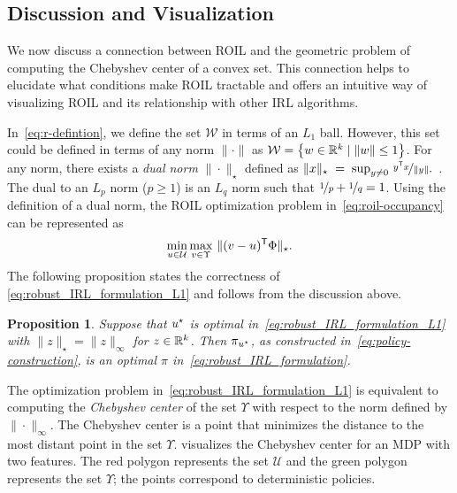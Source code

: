 \documentclass[10pt]{article}
\renewcommand{\cite}{\citep}
\theoremstyle{plain}
\newtheorem{proposition}{Proposition}
\theoremstyle{remark}
\newcommand{\gersi}[1]{\textcolor{red}{[#1]}}
\begin{document}
\subsection{Discussion and Visualization}
\label{sec:geom-intu-reduct}

We now discuss a connection between ROIL and the geometric problem of computing the Chebyshev center of a convex set. This connection helps to elucidate what conditions make ROIL tractable and offers an intuitive way of visualizing ROIL and its relationship with other IRL algorithms. 

In~\eqref{eq:r-defintion}, we define the set $\mathcal{W}$ in terms of an $L_1$ ball. However, this set could be defined in terms of any norm $\| \cdot \|$ as $\mathcal{W} = \left\{ w\in \mathbb{R}^k \mid \| w \| \le 1 \right\}$.  For any norm, there exists a \emph{dual norm} $\| \cdot  \|_{\star}$ defined as \( \| x\|_{\star}\; =\;  \sup_{y \neq 0} \, \nicefrac{y ^{\mathsf{T}} x}{\|y\|} . \)~\cite{Horn2013}.
The dual to an $L_p$ norm ($p \ge 1$) is an $L_q$ norm such that $\nicefrac{1}{p} + \nicefrac{1}{q} = 1$. Using the definition of a dual norm, the ROIL optimization problem in~\eqref{eq:roil-occupancy} can be represented as
\begin{equation} \label{eq:robust_IRL_formulation_L1}
\min_{u \in \mathcal{U}} \max_{v \in \Upsilon} \, \|(v - u)^{\mathsf{T}} \Phi\|_{\star}.
\end{equation}
The following proposition states the correctness of \eqref{eq:robust_IRL_formulation_L1} and follows from the discussion above. 
\begin{proposition}
\label{thrm:chebeyshevRegret}
Suppose that $u^{\mathnormal{\star}}$ is optimal in~\eqref{eq:robust_IRL_formulation_L1} with $\| z  \|_{\star} = \| z \|_{\infty}$ for $z\in \mathbb{R}^k$. Then $\pi_{u^{\mathnormal{\star}}}$, as constructed in~\eqref{eq:policy-construction}, is an optimal $\pi$ in~\eqref{eq:robust_IRL_formulation}.
\end{proposition}

The optimization problem in~\eqref{eq:robust_IRL_formulation_L1} is equivalent to computing the \emph{Chebyshev center} of the set $\Upsilon$ with respect to the norm defined by $\| \cdot  \|_{\infty}$. The Chebyshev center is a point that minimizes the distance to the most distant point in the set $\Upsilon$.  visualizes the Chebyshev center for an MDP with two features. The red polygon represents the set $\mathcal{U}$ and the green polygon represents the set $\Upsilon$; the points correspond to deterministic policies.
\end{document}

